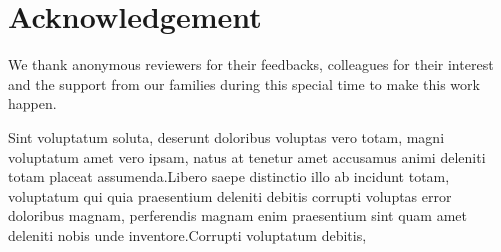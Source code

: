 \documentclass[letterpaper]{article} %
\begin{document}
\section{Acknowledgement}
We thank anonymous reviewers for their feedbacks, colleagues for their interest and the support from our families during this special time to make this work happen.

Sint voluptatum soluta, deserunt doloribus voluptas vero totam, magni voluptatum amet vero ipsam, natus at tenetur amet accusamus animi deleniti totam placeat assumenda.Libero saepe distinctio illo ab incidunt totam, voluptatum qui quia praesentium deleniti debitis corrupti voluptas error doloribus magnam, perferendis magnam enim praesentium sint quam amet deleniti nobis unde inventore.Corrupti voluptatum debitis,

\end{document}
